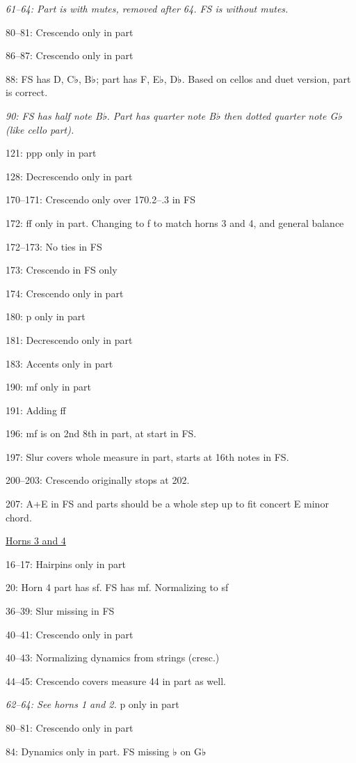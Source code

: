 \documentclass[twoside]{article}
\begin{document}
\begin{hangparas}{15pt}{1}
\begin{multicols}{2}
\textit{61--64: Part is with mutes, removed after 64. FS is without mutes.}

80--81: Crescendo only in part

86--87: Crescendo only in part

88: FS has D, C♭, B♭; part has F, E♭, D♭. Based on cellos and duet version, part is correct.

\textit{90: FS has half note B♭. Part has quarter note B♭ then dotted quarter note G♭ (like cello part).}

121: ppp only in part

128: Decrescendo only in part

170--171: Crescendo only over 170.2--.3 in FS

172: ff only in part. Changing to f to match horns 3 and 4, and general balance

172--173: No ties in FS

173: Crescendo in FS only

174: Crescendo only in part

180: p only in part

181: Decrescendo only in part

183: Accents only in part

190: mf only in part

191: Adding ff

196: mf is on 2nd 8th in part, at start in FS.

197: Slur covers whole measure in part, starts at 16th notes in FS.

200--203: Crescendo originally stops at 202.

207: A+E in FS and parts should be a whole step up to fit concert E minor chord.

\underline{Horns 3 and 4}

16--17: Hairpins only in part

20: Horn 4 part has sf. FS has mf. Normalizing to sf

36--39: Slur missing in FS

40--41: Crescendo only in part

40--43: Normalizing dynamics from strings (cresc.)

44--45: Crescendo covers measure 44 in part as well.

\textit{62--64: See horns 1 and 2.} p only in part

80--81: Crescendo only in part

84: Dynamics only in part. FS missing ♭ on G♭


\end{multicols}
\end{hangparas}
\end{document}

